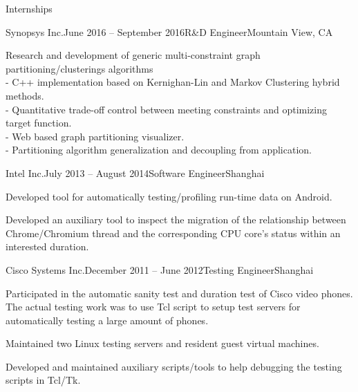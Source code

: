\documentclass{resume} %
\begin{document}

\begin{rSection}{Internships}

    \begin{rSubsection}{Synopsys Inc.}{June 2016 -- September 2016}{R\&D Engineer}{Mountain View, CA}

    \item Research and development of generic multi-constraint graph partitioning/clusterings algorithms
     \\- C++ implementation based on Kernighan-Lin and Markov Clustering hybrid methods.
     \\- Quantitative trade-off control between meeting constraints and optimizing target function.
     \\- Web based graph partitioning visualizer.
     \\- Partitioning algorithm generalization and decoupling from application.
    \end{rSubsection}

    \begin{rSubsection}{Intel Inc.}{July 2013 -- August 2014}{Software Engineer}{Shanghai}

    \item Developed tool for automatically testing/profiling run-time data on Android.

    \item Developed an auxiliary tool to inspect the migration of the
        relationship between Chrome/Chromium thread and the corresponding CPU
        core's status within an interested duration.

    \end{rSubsection}

    \begin{rSubsection}{Cisco Systems Inc.}{December 2011 -- June 2012}{Testing Engineer}{Shanghai}

    \item Participated in the automatic sanity test and duration test of Cisco
        video phones. The actual testing work was to use Tcl script to
        setup test servers for automatically testing a large amount of phones.

    \item Maintained two Linux testing servers and resident guest virtual
        machines.

    \item Developed and maintained auxiliary scripts/tools to help debugging
        the testing scripts in Tcl/Tk.

    \end{rSubsection}

\end{rSection}
\end{document}
